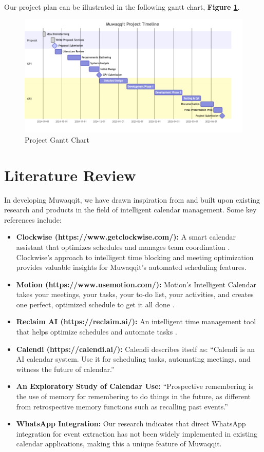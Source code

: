 \documentclass[12pt,a4paper]{article}
\begin{document}
Our project plan can be illustrated in the following gantt chart, \textbf{Figure \ref{fig:project-gantt-chart}}.

\begin{figure}[!h]
    \centering
    \includegraphics[width=\textwidth]{images/gantt.png}
    \caption{Project Gantt Chart}
    \label{fig:project-gantt-chart}
\end{figure}

\section{Literature Review}

In developing Muwaqqit, we have drawn inspiration from and built upon existing research and products in the field of intelligent calendar management. Some key references include:

\begin{itemize}
    \item \textbf{Clockwise (https://www.getclockwise.com/):} A smart calendar assistant that optimizes schedules and manages team coordination \cite{clockwise}. Clockwise's approach to intelligent time blocking and meeting optimization provides valuable insights for Muwaqqit's automated scheduling features.
    \item \textbf{Motion (https://www.usemotion.com/):} Motion's Intelligent Calendar takes your meetings, your tasks, your to-do list, your activities, and creates one perfect, optimized schedule to get it all done \cite{motion}.
    \item \textbf{Reclaim AI (https://reclaim.ai/):} An intelligent time management tool that helps optimize schedules and automate tasks \cite{reclaim}.
    \item \textbf{Calendi (https://calendi.ai/):} Calendi describes itself as: ``Calendi is an AI calendar system. Use it for scheduling tasks, automating meetings, and witness the future of calendar.'' \cite{calendi}
    \item \textbf{An Exploratory Study of Calendar Use:} ``Prospective remembering is the use of memory for remembering to do things in the future, as different from retrospective memory functions such as recalling past events.'' \cite{tungare2008exploratorystudycalendaruse}
    \item \textbf{WhatsApp Integration:} Our research indicates that direct WhatsApp integration for event extraction has not been widely implemented in existing calendar applications, making this a unique feature of Muwaqqit.
\end{itemize}
\end{document}
